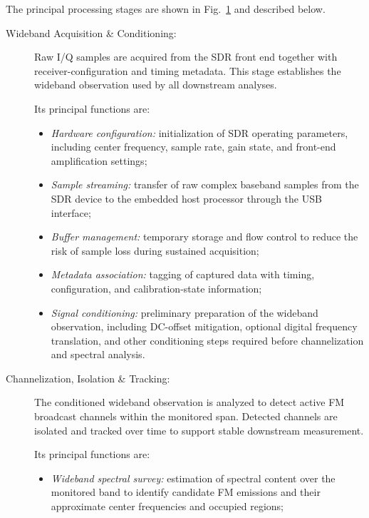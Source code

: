 \documentclass[11pt]{report}
\begin{document}
The principal processing stages are shown in Fig.~\ref{fig:processing_pipeline} and described below.

\begin{figure}[!ht]
	
	\label{fig:processing_pipeline}
\end{figure}

\begin{description}
	
	\item[Wideband Acquisition \& Conditioning:]
	Raw I/Q samples are acquired from the SDR front end together with receiver-configuration and timing metadata. This stage establishes the wideband observation used by all downstream analyses.
	
	Its principal functions are:
	\begin{itemize}
		\item \textit{Hardware configuration:} initialization of SDR operating parameters, including center frequency, sample rate, gain state, and front-end amplification settings;
		
		\item \textit{Sample streaming:} transfer of raw complex baseband samples from the SDR device to the embedded host processor through the USB interface;
		
		\item \textit{Buffer management:} temporary storage and flow control to reduce the risk of sample loss during sustained acquisition;
		
		\item \textit{Metadata association:} tagging of captured data with timing, configuration, and calibration-state information;
		
		\item \textit{Signal conditioning:} preliminary preparation of the wideband observation, including DC-offset mitigation, optional digital frequency translation, and other conditioning steps required before channelization and spectral analysis.
	\end{itemize}
	
	\item[Channelization, Isolation \& Tracking:]
	The conditioned wideband observation is analyzed to detect active FM broadcast channels within the monitored span. Detected channels are isolated and tracked over time to support stable downstream measurement.
	
	Its principal functions are:
	\begin{itemize}
		\item \textit{Wideband spectral survey:} estimation of spectral content over the monitored band to identify candidate FM emissions and their approximate center frequencies and occupied regions;
		

\end{itemize}
\end{description}
\end{document}
